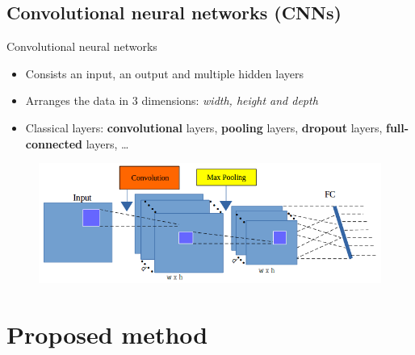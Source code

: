 \documentclass[10pt,svgnames]{beamer}
\begin{document}
\subsection{Convolutional neural networks (CNNs)}
\begin{frame}{Convolutional neural networks}
	\begin{itemize}
		\item Consists an input, an output and multiple hidden layers\footnotemark[1]
		\item Arranges the data in $3$ dimensions: \textit{width, height and depth}
		\item Classical layers: \textbf{\color{conv}convolutional} layers, \textbf{\color{pool}pooling} layers, \textbf{\color{drop}dropout} layers, \textbf{\color{blue}full-connected} layers, \ldots
	\end{itemize}
	\begin{figure}[htbp]
  		\centering
   	 	\includegraphics[scale=.27]{images/arch_cnn1}
	\end{figure}
\end{frame}
\section{Proposed method}
\end{document}
